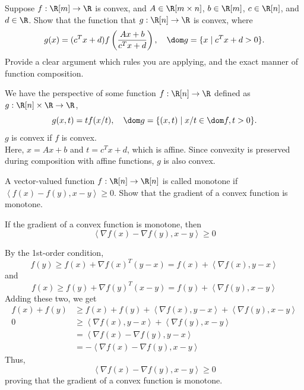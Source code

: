 \documentclass[11pt]{article}
\begin{document}
\pagebreak

\begin{homeworkProblem}
    Suppose $f : \R[m] \rightarrow \R$ is convex, and $A \in \R[m\times n]$, $b \in \R[m]$, $c \in \R[n]$, and $d \in \R$. Show that the function
    that $g : \R[n] \rightarrow \R$ is convex, where
    \[
        g(x) = (c^T x + d) f\left(\frac{Ax + b}{c^T x + d}\right), \quad \dom g = \{x \mid c^T x + d > 0\}.
    \]
    Provide a clear argument which rules you are applying, and the exact manner of function composition. \\

    \solution

    We have the perspective of some function $f: \R[n] \to \R$ defined as $g: \R[n] \times \R \to \R$,
    \[
        g(x, t) = t f(x/t), \quad \dom g = \{(x, t) \mid x/t \in \dom f, t > 0\}.
    \]
    $g$ is convex if $f$ is convex. \\

    Here, $x = Ax + b$ and $t = c^T x + d$, which is affine. Since convexity is preserved during composition with affine functions, $g$ is also convex.


\end{homeworkProblem}

\pagebreak

\begin{homeworkProblem}
    A vector-valued function $f : \R[n] \rightarrow \R[n]$ is called monotone if $\left< f(x) - f(y), x - y\right> \geq 0$. Show that
    the gradient of a convex function is monotone. \\

    \solution

    If the gradient of a convex function is monotone, then
    \[
        \left< \nabla f(x) - \nabla f(y), x - y\right> \geq 0
    \]

    By the 1st-order condition,
    \[
        f(y) \geq f(x) + \nabla f(x)^T (y - x) = f(x) + \left< \nabla f(x), y - x \right>
    \]
    and
    \[
        f(x) \geq f(y) + \nabla f(y)^T (x - y) = f(y) + \left< \nabla f(y), x - y \right>
    \]
    Adding these two, we get
    \begin{align*}
        f(x) + f(y) & \geq f(x) + f(y) + \left< \nabla f(x), y - x \right> + \left< \nabla f(y), x - y \right> \\
        0           & \geq \left< \nabla f(x), y - x \right> + \left< \nabla f(y), x - y \right>               \\
                    & = \left< \nabla f(x) - \nabla f(y), y - x \right>                                        \\
                    & = -\left< \nabla f(x) - \nabla f(y), x - y \right>
    \end{align*}
    Thus,
    \[
        \left< \nabla f(x) - \nabla f(y), x - y \right> \geq 0
    \]
    proving that the gradient of a convex function is monotone.

\end{homeworkProblem}
\end{document}
